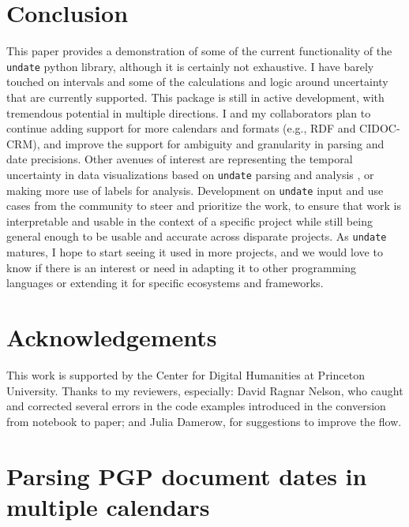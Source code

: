 \documentclass[final]{anthology-ch} %
\begin{document}
\section{Conclusion}

This paper provides a demonstration of some of the current functionality of the \texttt{undate} python library, although it is certainly not exhaustive. I have barely touched on intervals and some of the calculations and logic around uncertainty that are currently supported. This package is still in active development, with tremendous potential in multiple directions. I and my collaborators plan to continue adding support for more calendars and formats (e.g., RDF and CIDOC-CRM), and improve the support for ambiguity and granularity in parsing and date precisions.  Other avenues of interest are representing the temporal uncertainty in data visualizations based on \texttt{undate} parsing and analysis \cite{yau_visualizing_2018}, or making more use of labels for analysis. Development on \texttt{undate} input and use cases from the community to steer and prioritize the work, to ensure that work is interpretable and usable in the context of a specific project while still being general enough to be usable and accurate across disparate projects.  As \texttt{undate} matures, I hope to start seeing it used in more projects, and we would love to know if there is an interest or need in adapting it to other programming languages or extending it for specific ecosystems and frameworks.


\section*{Acknowledgements}
This work is supported by the Center for Digital Humanities at Princeton University.  Thanks to my reviewers, especially: David Ragnar Nelson, who caught and corrected several errors in the code examples introduced in the conversion from notebook to paper; and Julia Damerow, for suggestions to improve the flow.

\printbibliography

\appendix

\section{Parsing PGP document dates in multiple calendars} \label{appdx:parse-pgp-dates}
\end{document}

